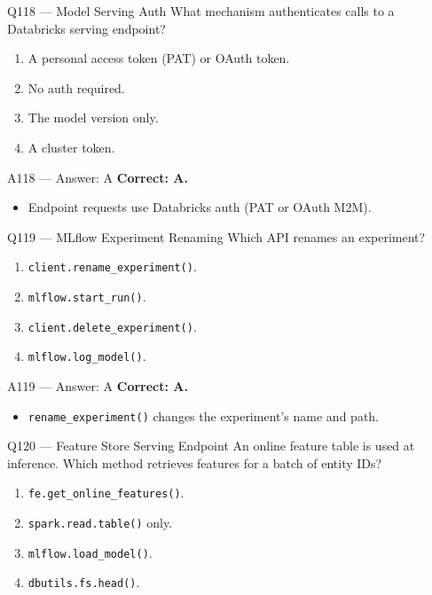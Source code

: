 \documentclass[aspectratio=169,9pt]{beamer}
\begin{document}
	\begin{frame}{Q118 --- Model Serving Auth}
		What mechanism authenticates calls to a Databricks serving endpoint?
		\begin{enumerate}[label=\Alph*.]
			\item A personal access token (PAT) or OAuth token.
			\item No auth required.
			\item The model version only.
			\item A cluster token.
		\end{enumerate}
	\end{frame}
	
	\begin{frame}{A118 --- Answer: A}
		\textbf{Correct: A.}
		\begin{itemize}
			\item Endpoint requests use Databricks auth (PAT or OAuth M2M).
		\end{itemize}
	\end{frame}
	
	\begin{frame}{Q119 --- MLflow Experiment Renaming}
		Which API renames an experiment?
		\begin{enumerate}[label=\Alph*.]
			\item \texttt{client.rename\_experiment()}.
			\item \texttt{mlflow.start\_run()}.
			\item \texttt{client.delete\_experiment()}.
			\item \texttt{mlflow.log\_model()}.
		\end{enumerate}
	\end{frame}
	
	\begin{frame}{A119 --- Answer: A}
		\textbf{Correct: A.}
		\begin{itemize}
			\item \texttt{rename\_experiment()} changes the experiment's name and path.
		\end{itemize}
	\end{frame}
	
	\begin{frame}{Q120 --- Feature Store Serving Endpoint}
		An online feature table is used at inference. Which method retrieves features for a batch of entity IDs?
		\begin{enumerate}[label=\Alph*.]
			\item \texttt{fe.get\_online\_features()}.
			\item \texttt{spark.read.table()} only.
			\item \texttt{mlflow.load\_model()}.
			\item \texttt{dbutils.fs.head()}.
		\end{enumerate}
	\end{frame}
	
\end{document}
